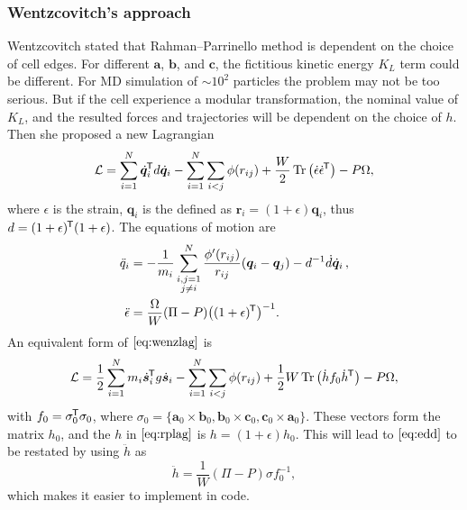 \subsubsection{Wentzcovitch's approach}

Wentzcovitch stated that Rahman--Parrinello method is dependent on
the choice of cell edges.\cite{Wentzcovitch:1991ka}
For different $\bm{a}$, $\bm{b}$, and
$\bm{c}$, the fictitious kinetic energy $K_L$ term could be different.
For MD simulation of $\sim 10^2$ particles the problem may
not be too serious. But if the cell experience a modular transformation,
the nominal value of $K_L$, and the resulted forces and trajectories
will be dependent on the choice of $h$. Then she proposed a new
Lagrangian
\begin{equation}\label{eq:wenzlag}
	\mathcal{L} = \sum_{i=1}^{N} \dot{ \bm{q} }_i^{\mkern-1.5mu\mathsf{T}} d \dot{ \bm{q} }_i
	- \sum_{i=1}^{N} \sum_{i<j} \phi(r_{ij}) + \frac{ W }{ 2 }
	\Tr \big( \dot{ \epsilon } \dot{ \epsilon }^{\mkern-1.5mu\mathsf{T}} \big) - P \Omega,
\end{equation}
where $\epsilon$ is the strain, $\bm{q}_i$ is the defined as
$\bm{r}_i = (1+\epsilon) \bm{q}_i$, thus $d = (1 + \epsilon)^{\mkern-1.5mu\mathsf{T}}
	(1+\epsilon)$.
The equations of motion are
\begin{align}
	\ddot{q}_i      & = - \frac{ 1 }{ m_i } \sum_{\substack{i, j=1 \\j\neq i}}^{N}
	\frac{ \phi'(r_{ij}) }{ r_{ij} }(\bm{q}_i - \bm{q}_j) - d^{-1} \dot{ d }
	\dot{ \bm{q} }_i \thinspace,                                   \\
	\ddot{\epsilon} & = \frac{ \Omega }{ W } (\Pi - P)
	\big((1+\epsilon)^{\mkern-1.5mu\mathsf{T}}\big)^{-1}.\label{eq:edd}
\end{align}
An equivalent form of $\eqref{eq:wenzlag}$ is
\begin{equation}
	\mathcal{L} = \frac{ 1 }{ 2 } \sum_{i=1}^{N} m_i \dot{ \bm{s} }_i ^{\mkern-1.5mu\mathsf{T}}
	g \dot{ \bm{s} }_i - \sum_{i=1}^{N} \sum_{i<j} \phi (r_{ij}) +
	\frac{ 1 }{ 2 } W \Tr \big(\dot{h} f_0 \dot{h}^{\mkern-1.5mu\mathsf{T}} \big) - P \Omega,
\end{equation}
with $f_0 = \sigma_0 ^{\mkern-1.5mu\mathsf{T}} \sigma_0$, where $\sigma_0 = \{
	\bm{a}_0 \times \bm{b}_0, \bm{b}_0 \times \bm{c}_0,
	\bm{c}_0 \times \bm{a}_0 \}$. These vectors form the matrix $h_0$,
and the $h$ in $\eqref{eq:rplag}$ is $h = (1+\epsilon) h_0$.
This will lead to $\eqref{eq:edd}$ to be restated by using $\ddot{h}$
as
\begin{equation}\label{eq:wenzhdd}
	\ddot{h} = \frac{ 1 }{ W } (\Pi - P) \sigma f_0^{-1},
\end{equation}
which makes it easier to implement in code.

